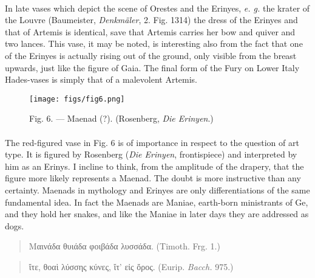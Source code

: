 \documentclass[a4paper, 11pt, oneside, polutonikogreek, english]{article}
\begin{document}
\paragraph{}
In late vases which depict the scene of Orestes and the Erinyes, \emph{e. g.} the krater of the Louvre (Baumeister, \emph{Denkmäler}, 2. Fig. 1314) the dress of the Erinyes and that of Artemis is identical, save that Artemis carries her bow and quiver and two lances. This vase, it may be noted, is interesting also from the fact that one of the Erinyes is actually rising out of the ground, only visible from the breast upwards, just like the figure of Gaia. The final form of the Fury on Lower Italy Hades-vases is simply that of a malevolent Artemis.
\begin{figure}[H]
\centering
\texttt{[image: figs/fig6.png]}
\caption{Fig. 6. --- Maenad (?). (Rosenberg, \emph{Die Erinyen}.)}
\end{figure}
\paragraph{}
The red-figured vase in Fig. 6 is of importance in respect to the question of art type. It is figured by Rosenberg (\emph{Die Erinyen}, frontispiece) and interpreted by him as an Erinys. I incline to think, from the amplitude of the drapery, that the figure more likely represents a Maenad. The doubt is more instructive than any certainty. Maenads in mythology and Erinyes are only differentiations of the same fundamental idea. In fact the Maenads are Maniae, earth-born ministrants of Ge, and they hold her snakes, and like the Maniae in later days they are addressed as dogs.
\begin{quotation}
Μαινάδα θυιάδα φοιβάδα λυσσάδα. (Timoth. Frg. 1.)
\end{quotation}
\begin{quotation}
ἴτε, θοαὶ λύσσης κύνες, ἴτ' εἰς ὄρος. (Eurip. \emph{Bacch.} 975.)
\end{quotation}
\end{document}
